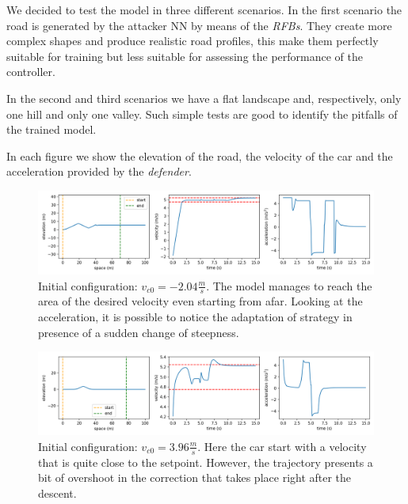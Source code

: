 We decided to test the model in three different scenarios.
In the first scenario the road is generated by the attacker NN by means of the \textit{RFBs}.
They create more complex shapes and produce realistic road profiles, this make them perfectly suitable for training but less suitable for assessing the performance of the controller.

In the second and third scenarios we have a flat landscape and, respectively, only one hill and only one valley.
Such simple tests are good to identify the pitfalls of the trained model.

In each figure we show the elevation of the road, the velocity of the car and the acceleration provided by the \textit{defender}.

\begin{figure}[H]
	\centering
	\includegraphics[width=13.8cm, keepaspectratio]{img/5_2_triplot_atk.png}
	\caption{Initial configuration: $v_{c0}=-2.04 \frac{m}{s}$. The model manages to reach the area of the desired velocity even starting from afar. Looking at the acceleration, it is possible to notice the adaptation of strategy in presence of a sudden change of steepness.}
    \label{fig:cruise_atk}
\end{figure}

\begin{figure}[H]
	\centering
	\includegraphics[width=13.8cm, keepaspectratio]{img/5_2_triplot_up.png}
	\caption{Initial configuration: $v_{c0}=3.96 \frac{m}{s}$. Here the car start with a velocity that is quite close to the setpoint. However, the trajectory presents a bit of overshoot in the correction that takes place right after the descent.}
    \label{fig:cruise_up}
\end{figure}

